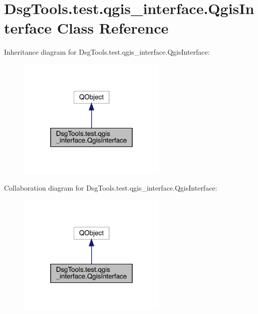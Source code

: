 \hypertarget{class_dsg_tools_1_1test_1_1qgis__interface_1_1_qgis_interface}{}\section{Dsg\+Tools.\+test.\+qgis\+\_\+interface.\+Qgis\+Interface Class Reference}
\label{class_dsg_tools_1_1test_1_1qgis__interface_1_1_qgis_interface}


Inheritance diagram for Dsg\+Tools.\+test.\+qgis\+\_\+interface.\+Qgis\+Interface\+:
\nopagebreak
\begin{figure}[H]
\begin{center}
\leavevmode
\includegraphics[width=202pt]{class_dsg_tools_1_1test_1_1qgis__interface_1_1_qgis_interface__inherit__graph}
\end{center}
\end{figure}


Collaboration diagram for Dsg\+Tools.\+test.\+qgis\+\_\+interface.\+Qgis\+Interface\+:
\nopagebreak
\begin{figure}[H]
\begin{center}
\leavevmode
\includegraphics[width=202pt]{class_dsg_tools_1_1test_1_1qgis__interface_1_1_qgis_interface__coll__graph}
\end{center}
\end{figure}
